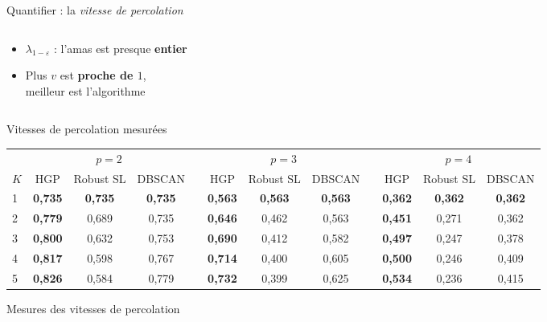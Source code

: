 \begin{frame}{Quantifier : la \emph{vitesse de percolation}}
\begin{columns}[c, onlytextwidth]
\begin{column}{0.40\textwidth}
            \vspace{0.25cm}
            \begin{itemize}
                \setlength{\itemsep}{10pt}
                \item $\lambda_{1-\varepsilon}$ : l'amas est presque \textbf{entier}
                \item Plus $v$ est \textbf{proche de $1$},\\ meilleur est l'algorithme  
            \end{itemize}
        \end{column}
    \end{columns}
\end{frame}

\begin{frame}{Vitesses de percolation mesurées}
    \begin{center}
        \footnotesize
        \renewcommand{\arraystretch}{1.3}
        \setlength{\tabcolsep}{4pt}
        \begin{tabular}{@{} l ccc c ccc c ccc @{}}
            \toprule
            & \multicolumn{3}{c}{$p=2$} & \phantom{a} & \multicolumn{3}{c}{$p=3$} & \phantom{a} & \multicolumn{3}{c}{$p=4$} \\
            \cmidrule{2-4} \cmidrule{6-8} \cmidrule{10-12}
            $K$ & HGP & Robust SL & DBSCAN && HGP & Robust SL & DBSCAN && HGP & Robust SL & DBSCAN \\
            \midrule
            1 & \textbf{0,735} & \textbf{0,735} & \textbf{0,735} && \textbf{0,563} & \textbf{0,563} & \textbf{0,563} && \textbf{0,362} & \textbf{0,362} & \textbf{0,362} \\
            2 & \textbf{0,779} & 0,689 & 0,735 && \textbf{0,646} & 0,462 & 0,563 && \textbf{0,451} & 0,271 & 0,362 \\
            3 & \textbf{0,800} & 0,632 & 0,753 && \textbf{0,690} & 0,412 & 0,582 && \textbf{0,497} & 0,247 & 0,378 \\
            4 & \textbf{0,817} & 0,598 & 0,767 && \textbf{0,714} & 0,400 & 0,605 && \textbf{0,500} & 0,246 & 0,409 \\
            5 & \textbf{0,826} & 0,584 & 0,779 && \textbf{0,732} & 0,399 & 0,625 && \textbf{0,534} & 0,236 & 0,415 \\
            \bottomrule
        \end{tabular}

        \vspace{0.12cm}
        {\small Mesures des vitesses de percolation }
    \end{center}


\end{frame}

